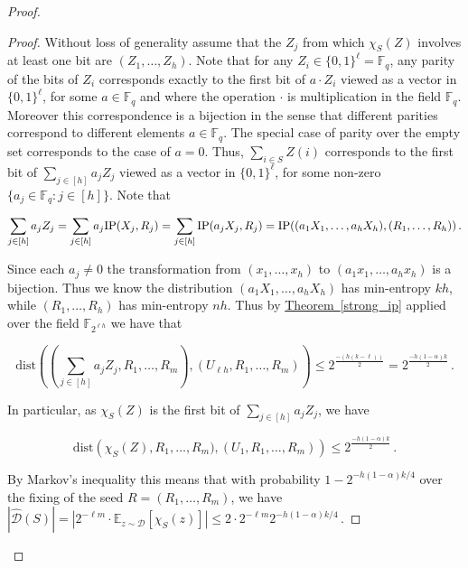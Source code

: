 \documentclass[11pt]{article}
\numberwithin{equation}{section}
\theoremstyle{definition}
\theoremstyle{plain}
\newcommand{\expref}[2]{\hyperref[#2]{#1~\ref{#2}}}
\def\E{\mathbb{E}}
\def\dist{\mathrm{dist}}
\newcommand{\IP}{\textnormal{IP}}
\newcommand{\F}{\mathbb{F}}
\newcommand{\calD}{\mathcal{D}} %
\begin{document}
\begin{proof}
\begin{proof}
Without loss of generality assume that the 
%
$Z_j$   %
from which $\chi_S(Z)$ involves at least one bit are $(Z_1, \ldots, Z_h)$. Note that
for any $Z_i \in \{0, 1\}^{\ell}=\F_q$, any parity of the bits of $Z_i$ corresponds exactly to the first bit of $a \cdot Z_i$ viewed as a vector in
$\{0, 1\}^{\ell}$, for some $a \in \F_q$ and where the operation $\cdot$ is multiplication in the field $\F_q$. Moreover this correspondence is a bijection
in the sense that different parities correspond to different elements $a \in \F_q$. The special case of parity over the empty set corresponds to the
case of $a=0$. Thus, $\sum_{i \in S} Z(i)$ corresponds to the first bit of $\sum_{j \in [h]} a_j Z_j$ viewed as a vector in $\{0, 1\}^{\ell}$, for
some non-zero $\{a_j \in \F_q: j \in [h]\}$. Note that

\begin{equation}
\sum_{j \in [h]} a_j Z_j =\sum_{j \in [h]} a_j \IP(X_j, R_j)=\sum_{j \in [h]}  \IP( a_j X_j, R_j)=\IP((a_1 X_1, \ldots, a_h X_h), (R_1, \ldots,
R_h))\,.
\end{equation}

Since each $a_j \neq 0$ the transformation from $(x_1, \ldots, x_h)$ to $(a_1 x_1, \ldots, a_h x_h)$ is a bijection. Thus we know the distribution
$(a_1 X_1, \ldots, a_h X_h)$ has min-entropy $kh$, while $(R_1, \ldots, R_h)$ has min-entropy $nh$. Thus by \expref{Theorem}{strong_ip} applied over the
field $\F_{2^{\ell h}}$ we have that

\begin{equation}
\dist\left((\sum_{j \in [h]} a_j Z_j, R_1, \ldots, R_m),(U_{\ell h}, R_1, \ldots, R_m)\right)\leq
2^{\frac{-(h(k-\ell))}{2}}=2^{\frac{-h(1-\alpha)k}{2}}\,.
\end{equation}
%

In particular, as $\chi_S(Z)$ is the first bit of $\sum_{j \in [h]} a_j Z_j$, we have

\begin{equation}
\dist\left(\chi_S(Z), R_1, \ldots, R_m),(U_1, R_1, \ldots, R_m)\right)\leq 2^{\frac{-h(1-\alpha)k}{2}}\,.
\end{equation}
  
By Markov's inequality this means that with probability
%
$1-2^{-h(1-\alpha)k/4}$  %
over the fixing of the seed $R=(R_1,\ldots,R_m)$, we have
$|\hat{\calD}(S) |=|2^{-\ell m}\cdot \E_{z \sim {\calD}} [\chi_S(z)]| 
\leq 2 \cdot 2^{-\ell m} %
2^{-h(1-\alpha)k/4}$\,.   %
\end{proof}


\end{proof}
\end{document}
